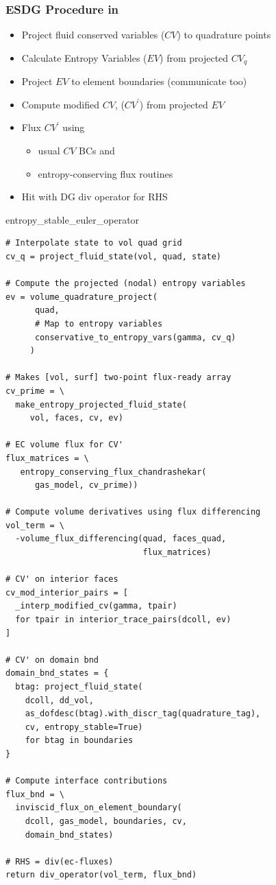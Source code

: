 \begin{frame}[fragile]\frametitle{ESDG Procedure in \mirgecom{}}
\begin{multicols}{2}
\begin{itemize}
\setlength{\itemsep}{3pt}
\item Project fluid conserved variables ($CV$) to quadrature points
\item Calculate Entropy Variables ($EV$) from projected $CV_q$
\item Project $EV$ to element boundaries (communicate too)
\item Compute modified $CV$, (${CV}^\prime$) from projected $EV$
\item Flux ${CV}^\prime$ using
\begin{itemize}
\item usual $CV$ BCs and
\item entropy-conserving flux routines
\end{itemize}
\item Hit with DG div operator for RHS
\end{itemize}
\columnbreak
\begin{center}
entropy\_stable\_euler\_operator
\end{center}
\vspace{-10pt}
\begin{lstlisting}
# Interpolate state to vol quad grid
cv_q = project_fluid_state(vol, quad, state)

# Compute the projected (nodal) entropy variables
ev = volume_quadrature_project(
      quad,
      # Map to entropy variables
      conservative_to_entropy_vars(gamma, cv_q)
     )

# Makes [vol, surf] two-point flux-ready array
cv_prime = \
  make_entropy_projected_fluid_state(
     vol, faces, cv, ev)

# EC volume flux for CV'
flux_matrices = \
   entropy_conserving_flux_chandrashekar(
      gas_model, cv_prime))

# Compute volume derivatives using flux differencing
vol_term = \
  -volume_flux_differencing(quad, faces_quad,
                            flux_matrices)

# CV' on interior faces
cv_mod_interior_pairs = [
  _interp_modified_cv(gamma, tpair)
  for tpair in interior_trace_pairs(dcoll, ev)
]

# CV' on domain bnd
domain_bnd_states = {
  btag: project_fluid_state(
    dcoll, dd_vol,
    as_dofdesc(btag).with_discr_tag(quadrature_tag),
    cv, entropy_stable=True)
    for btag in boundaries
}

# Compute interface contributions
flux_bnd = \
  inviscid_flux_on_element_boundary(
    dcoll, gas_model, boundaries, cv,
    domain_bnd_states)

# RHS = div(ec-fluxes) 
return div_operator(vol_term, flux_bnd)

\end{lstlisting}
\end{multicols}
\end{frame}

